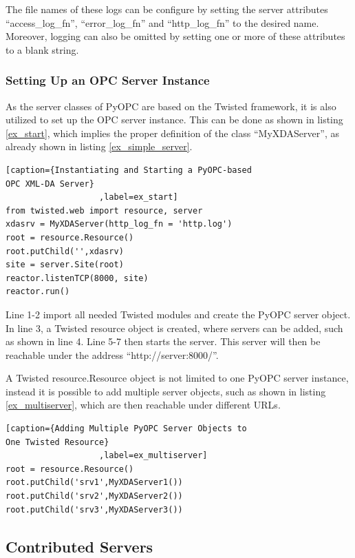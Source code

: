 The file names of these logs can be configure by setting the server
attributes ``access\_log\_fn'', ``error\_log\_fn'' and
``http\_log\_fn'' to the desired name. Moreover, logging can also be
omitted by setting one or more of these attributes to a blank string.

\subsubsection*{Setting Up an OPC Server Instance}

As the server classes of PyOPC are based on the Twisted framework, it
is also utilized to set up the OPC server instance. This can be done
as shown in listing \ref{ex_start}, which implies the proper
definition of the class ``MyXDAServer'', as already shown in listing
\ref{ex_simple_server}.

\lstset{language=C}
\begin{lstlisting}[caption={Instantiating and Starting a PyOPC-based
OPC XML-DA Server}
                   ,label=ex_start] 
from twisted.web import resource, server
xdasrv = MyXDAServer(http_log_fn = 'http.log')
root = resource.Resource()
root.putChild('',xdasrv)
site = server.Site(root)
reactor.listenTCP(8000, site)
reactor.run()
\end{lstlisting}

Line 1-2 import all needed Twisted modules and create the PyOPC
server object. In line 3, a Twisted resource object is created, where
servers can be added, such as shown in line 4. Line 5-7 then starts
the server. This server will then be reachable under the address
``http://server:8000/''.

A Twisted resource.Resource object is not limited to one PyOPC server
instance, instead it is possible to add multiple server objects, such
as shown in listing \ref{ex_multiserver}, which are then reachable
under different URLs.

\lstset{language=C}
\begin{lstlisting}[caption={Adding Multiple PyOPC Server Objects to
One Twisted Resource}
                   ,label=ex_multiserver] 
root = resource.Resource()
root.putChild('srv1',MyXDAServer1())
root.putChild('srv2',MyXDAServer2())
root.putChild('srv3',MyXDAServer3())
\end{lstlisting}

\subsection{Contributed Servers}

